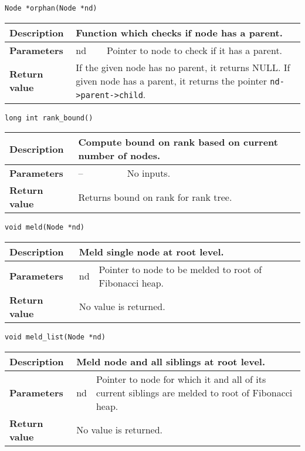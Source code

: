 \documentclass[12pt, reqno]{amsart}
\begin{document}
{\large \texttt{Node *orphan(Node *nd)}}
\begin{center}
    \begin{tabular}{| l | p{2.5cm} | p{9.5cm} |}
    \hline
    {\bfseries Description} & \multicolumn{2}{p{12.5cm}|}{Function which checks if node has a parent.} \\ \hline
    \multirow{1}{*}{\bfseries Parameters} & nd & Pointer to node to check if it has a parent. \\ \hline
    {\bfseries Return value} & \multicolumn{2}{p{12.5cm}|}{If the given node has no parent, it returns NULL. If given node has a parent, it returns the pointer \texttt{nd->parent->child}.} \\ \hline
    \end{tabular}
\end{center}    

{\large \texttt{long int rank\_bound()}}
\begin{center}
    \begin{tabular}{| l | p{2.5cm} | p{9.5cm} |}
    \hline
    {\bfseries Description} & \multicolumn{2}{p{12.5cm}|}{Compute bound on rank based on current number of nodes.} \\ \hline
    \multirow{1}{*}{\bfseries Parameters} & -- & No inputs. \\ \hline
    {\bfseries Return value} & \multicolumn{2}{p{12.5cm}|}{Returns bound on rank for rank tree.} \\ \hline
    \end{tabular}
\end{center}    

{\large \texttt{void meld(Node *nd)}}
\begin{center}
    \begin{tabular}{| l | p{2.5cm} | p{9.5cm} |}
    \hline
    {\bfseries Description} & \multicolumn{2}{p{12.5cm}|}{Meld single node at root level.} \\ \hline
    \multirow{1}{*}{\bfseries Parameters} & nd & Pointer to node to be melded to root of Fibonacci heap. \\ \hline
    {\bfseries Return value} & \multicolumn{2}{p{12.5cm}|}{No value is returned.} \\ \hline
    \end{tabular}
\end{center}  

{\large \texttt{void meld\_list(Node *nd)}}
\begin{center}
    \begin{tabular}{| l | p{2.5cm} | p{9.5cm} |}
    \hline
    {\bfseries Description} & \multicolumn{2}{p{12.5cm}|}{Meld node and all siblings at root level.} \\ \hline
    \multirow{1}{*}{\bfseries Parameters} & nd & Pointer to node for which it and all of its current siblings are melded to root of Fibonacci heap. \\ \hline
    {\bfseries Return value} & \multicolumn{2}{p{12.5cm}|}{No value is returned.} \\ \hline
    \end{tabular}
\end{center}
 
\end{document}
